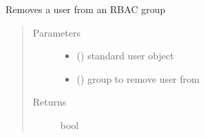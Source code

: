 \documentclass[letterpaper,10pt,english]{sphinxmanual}
\begin{document}
\begin{fulllineitems}
\label{\detokenize{rbac:rbac.core.rbac_remove_user_from_group}}
Removes a user from an RBAC group
\begin{quote}\begin{description}
\item[{Parameters}] \leavevmode\begin{itemize}
\item {} 
 ({\hyperref[\detokenize{accounts:accounts.models.User}]{}}) \textendash{} standard user object

\item {} 
 ({\hyperref[\detokenize{rbac:rbac.models.RBACGroup}]{}}) \textendash{} group to remove user from

\end{itemize}

\item[{Returns}] \leavevmode
bool

\end{description}\end{quote}

\end{fulllineitems}

\end{document}
